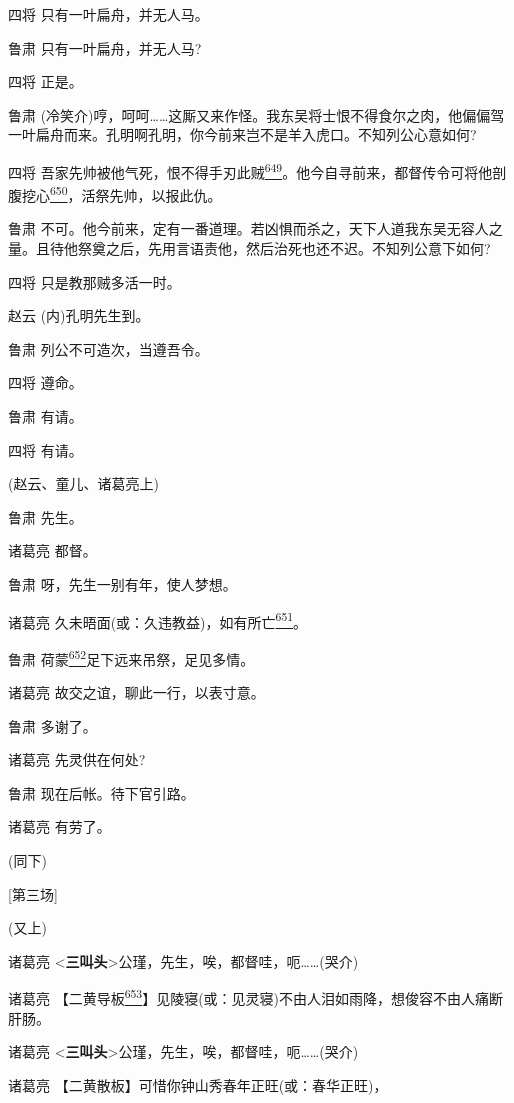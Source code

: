 四将 只有一叶扁舟，并无人马。

鲁肃 只有一叶扁舟，并无人马?

四将 正是。

鲁肃
(冷笑介)哼，呵呵\ldots{}\ldots{}这厮又来作怪。我东吴将士恨不得食尔之肉，他偏偏驾一叶扁舟而来。孔明啊孔明，你今前来岂不是羊入虎口。不知列公心意如何?

四将
吾家先帅被他气死，恨不得手刃此贼\protect\hyperlink{fn649}{\textsuperscript{649}}。他今自寻前来，都督传令可将他剖腹挖心\protect\hyperlink{fn650}{\textsuperscript{650}}，活祭先帅，以报此仇。

鲁肃
不可。他今前来，定有一番道理。若凶惧而杀之，天下人道我东吴无容人之量。且待他祭奠之后，先用言语责他，然后治死也还不迟。不知列公意下如何?

四将 只是教那贼多活一时。

赵云 (内)孔明先生到。

鲁肃 列公不可造次，当遵吾令。

四将 遵命。

鲁肃 有请。

四将 有请。

(赵云、童儿、诸葛亮上)

鲁肃 先生。

诸葛亮 都督。

鲁肃 呀，先生一别有年，使人梦想。

诸葛亮
{久未晤面}(或：久违教益)，如有所亡\protect\hyperlink{fn651}{\textsuperscript{651}}。

鲁肃
荷蒙\protect\hyperlink{fn652}{\textsuperscript{652}}足下远来吊祭，足见多情。

诸葛亮 故交之谊，聊此一行，以表寸意。

鲁肃 多谢了。

诸葛亮 先灵供在何处?

鲁肃 现在后帐。待下官引路。

诸葛亮 有劳了。

(同下)

{[}第三场{]}

(又上)

诸葛亮
\textless{}\textbf{三叫头}\textgreater{}公瑾，先生，唉，都督哇，呃\ldots{}\ldots{}(哭介)

诸葛亮
【二黄导板\protect\hyperlink{fn653}{\textsuperscript{653}}】{见陵寝}(或：见灵寝)不由人泪如雨降，想俊容不由人痛断肝肠。

诸葛亮
\textless{}\textbf{三叫头}\textgreater{}公瑾，先生，唉，都督哇，呃\ldots{}\ldots{}(哭介)

诸葛亮 【二黄散板】可惜你钟山秀{春年正旺}(或：春华正旺)，

